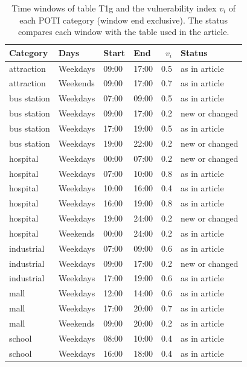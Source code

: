 
\begin{table}[htbp]
\centering
\small
\caption{Time windows of table T1g and the vulnerability index $v_i$ of each POTI category (window end exclusive). The status compares each window with the table used in the article.}
\label{tab:time-windows-t1g}
\begin{tabular}{llllrl}
\toprule
Category & Days & Start & End & $v_i$ & Status \\
\midrule
attraction & Weekdays & 09:00 & 17:00 & 0.5 & as in article \\
attraction & Weekends & 09:00 & 17:00 & 0.7 & as in article \\
bus station & Weekdays & 07:00 & 09:00 & 0.5 & as in article \\
bus station & Weekdays & 09:00 & 17:00 & 0.2 & new or changed \\
bus station & Weekdays & 17:00 & 19:00 & 0.5 & as in article \\
bus station & Weekdays & 19:00 & 22:00 & 0.2 & new or changed \\
hospital & Weekdays & 00:00 & 07:00 & 0.2 & new or changed \\
hospital & Weekdays & 07:00 & 10:00 & 0.8 & as in article \\
hospital & Weekdays & 10:00 & 16:00 & 0.4 & as in article \\
hospital & Weekdays & 16:00 & 19:00 & 0.8 & as in article \\
hospital & Weekdays & 19:00 & 24:00 & 0.2 & new or changed \\
hospital & Weekends & 00:00 & 24:00 & 0.2 & as in article \\
industrial & Weekdays & 07:00 & 09:00 & 0.6 & as in article \\
industrial & Weekdays & 09:00 & 17:00 & 0.2 & new or changed \\
industrial & Weekdays & 17:00 & 19:00 & 0.6 & as in article \\
mall & Weekdays & 12:00 & 14:00 & 0.6 & as in article \\
mall & Weekdays & 17:00 & 20:00 & 0.7 & as in article \\
mall & Weekends & 09:00 & 20:00 & 0.2 & as in article \\
school & Weekdays & 08:00 & 10:00 & 0.4 & as in article \\
school & Weekdays & 16:00 & 18:00 & 0.4 & as in article \\

\end{tabular}
\end{table}
